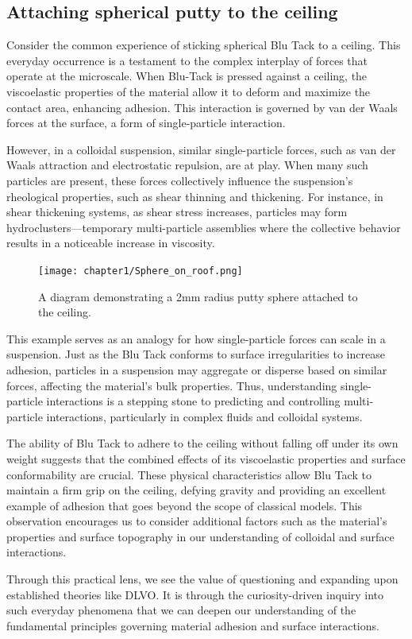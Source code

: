 \subsection{Attaching spherical putty to the ceiling}

Consider the common experience of sticking spherical Blu Tack to a ceiling. This everyday occurrence is a testament to the complex interplay of forces that operate at the microscale. When Blu-Tack is pressed against a ceiling, the viscoelastic properties of the material allow it to deform and maximize the contact area, enhancing adhesion. This interaction is governed by van der Waals forces at the surface, a form of single-particle interaction.

However, in a colloidal suspension, similar single-particle forces, such as van der Waals attraction and electrostatic repulsion, are at play. When many such particles are present, these forces collectively influence the suspension's rheological properties, such as shear thinning and thickening. For instance, in shear thickening systems, as shear stress increases, particles may form hydroclusters—temporary multi-particle assemblies where the collective behavior results in a noticeable increase in viscosity.

\begin{figure}[h]     %
        \begin{center}
          \texttt{[image: chapter1/Sphere\_on\_roof.png]}
\end{center}
\caption{A diagram demonstrating a 2mm radius putty sphere attached to the ceiling.}
\label{fig:disp}                 %
\end{figure}

This example serves as an analogy for how single-particle forces can scale in a suspension. Just as the Blu Tack conforms to surface irregularities to increase adhesion, particles in a suspension may aggregate or disperse based on similar forces, affecting the material's bulk properties. Thus, understanding single-particle interactions is a stepping stone to predicting and controlling multi-particle interactions, particularly in complex fluids and colloidal systems.

The ability of Blu Tack to adhere to the ceiling without falling off under its own weight suggests that the combined effects of its viscoelastic properties and surface conformability are crucial. These physical characteristics allow Blu Tack to maintain a firm grip on the ceiling, defying gravity and providing an excellent example of adhesion that goes beyond the scope of classical models. This observation encourages us to consider additional factors such as the material's properties and surface topography in our understanding of colloidal and surface interactions.

Through this practical lens, we see the value of questioning and expanding upon established theories like DLVO. It is through the curiosity-driven inquiry into such everyday phenomena that we can deepen our understanding of the fundamental principles governing material adhesion and surface interactions.
